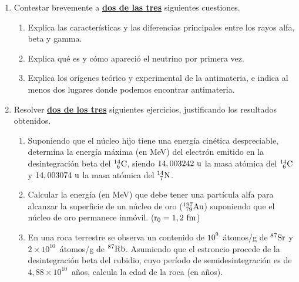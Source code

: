 \documentclass[11pt]{articulo}
\begin{document}
\begin{enumerate}

\item Contestar brevemente a {\bf\underline{dos de las tres}} siguientes cuestiones.

\begin{enumerate}
\item Explica las caracter\'isticas y las diferencias principales entre los rayos alfa, beta y gamma.
\item Explica qu\'e es y c\'omo apareci\'o el neutrino por primera vez.
\item Explica los or\'igenes te\'orico y experimental de la antimateria, e indica al menos dos lugares donde podemos encontrar antimateria.
\end{enumerate}

\item Resolver {\bf\underline{dos de los tres}} siguientes ejercicios, justificando los resultados obtenidos.

\begin{enumerate}

\item Suponiendo que el n\'ucleo hijo tiene una energ\'ia cin\'etica despreciable, determina la energ\'ia m\'axima (en MeV) del electr\'on emitido en la desintegraci\'on beta del ${\rm _{~6}^{14}C}$, siendo ${\rm 14,003242~u}$ la masa at\'omica del ${\rm _{~6}^{14}C}$ y ${\rm 14,003074~u}$ la masa at\'omica del ${\rm _{~7}^{14}N}$.

\item Calcular la energ\'ia (en MeV) que debe tener una part\'icula alfa para alcanzar la superficie de un n\'ucleo de oro (${\rm _{~79}^{197}Au}$) suponiendo que el n\'ucleo de oro permanece inm\'ovil. (${\rm r_0 = 1,2~fm}$)

\item En una roca terrestre se observa un contenido de $10^9$~\'atomos/g de ${\rm ^{87}Sr}$ y $2 \times 10^{10}$~\'atomos/g de ${\rm ^{87}Rb}$. Asumiendo que el estroncio procede de la desintegraci\'on beta del rubidio, cuyo per\'iodo de semidesintegraci\'on es de $4,88 \times 10^{10}$~a\~{n}os, calcula la edad de la roca (en a\~{n}os).

\end{enumerate}
\end{enumerate}


\vspace*{0.25cm}
\end{document}
